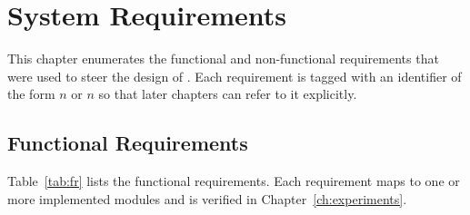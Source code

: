 \chapter{System Requirements}
\label{ch:requirements}

This chapter enumerates the functional and non-functional requirements
that were used to steer the design of \projname. Each requirement is
tagged with an identifier of the form $n$ or $n$
so that later chapters can refer to it explicitly.

\section{Functional Requirements}
\label{sec:fr}

Table~\ref{tab:fr} lists the functional requirements. Each requirement
maps to one or more implemented modules and is verified in
Chapter~\ref{ch:experiments}.


